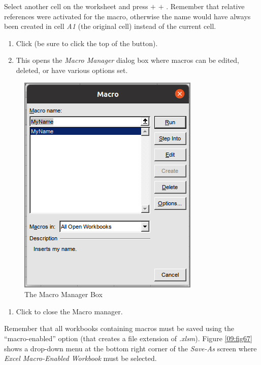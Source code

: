 Select another cell on the worksheet and press  $ + $  $ + $ . Remember that relative references were activated for the macro, otherwise the name would have always been created in cell \textit{A1} (the original cell) instead of the current cell.

\begin{enumerate}
	\item Click  (be sure to click the top of the  button).
	\item This opens the \textit{Macro Manager} dialog box where macros can be edited, deleted, or have various options set.
\end{enumerate}

\begin{figure}[H]
	\centering
	\includegraphics[width=\maxwidth{.75\linewidth}]{gfx/ch09_fig66}
	\caption{The Macro Manager Box}
	\label{09:fig66}
\end{figure}

\begin{enumerate}[resume]	
	\item Click  to close the Macro manager.
\end{enumerate}

Remember that all workbooks containing macros must be saved using the ``macro-enabled'' option (that creates a file extension of \textit{.xlsm}). Figure \ref{09:fig67} shows a drop-down menu at the bottom right corner of the \textit{Save-As} screen where \textit{Excel Macro-Enabled Workbook} must be selected. 

